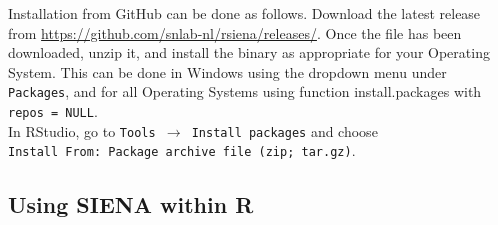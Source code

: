 \documentclass[a4paper,fleqn,11pt]{article}
\newcommand{\+}{\, + \,}
\newcommand{\sfn}[1]{\textsf{#1}}
\newcommand{\Rn}{{\sf R}}
\newcommand{\SI}{{\sf SIENA }}
\begin{document}
\begin{enumerate}
            Installation from GitHub can be done as follows.
        Download  the latest release from
        \url{https://github.com/snlab-nl/rsiena/releases/}.
Once the file has been downloaded, unzip it, and install the binary
as appropriate for your Operating System.
This can be done in Windows using the dropdown menu under \texttt{Packages},
and for all Operating Systems using function \sfn{install.packages}
with \texttt{repos = NULL}.\\
In \sfn{RStudio}, go to \texttt{Tools  $\rightarrow$ Install packages}
and choose\\ \texttt{Install From: Package archive file (zip; tar.gz)}.
\end{enumerate}


\subsection{Using \SI within \Rn}
\end{document}
